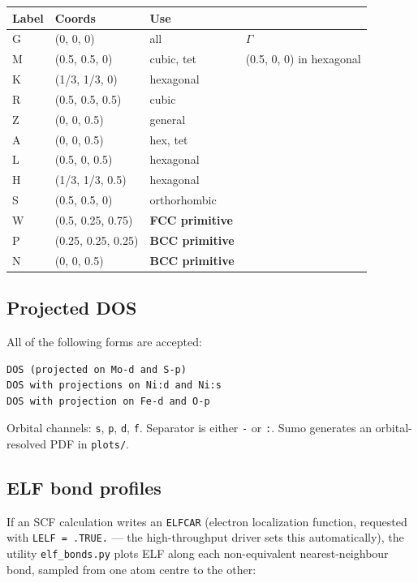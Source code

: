 \documentclass[11pt,a4paper]{scrartcl}
\newcommand{\thead}{\rowcolor{lightblue}}
\begin{document}
\begin{tabularx}{\linewidth}{@{}lllX@{}}
\thead
Label & Coords & Use & \\ \midrule
G & (0, 0, 0) & all & $\Gamma$ \\
M & (0.5, 0.5, 0) & cubic, tet & (0.5, 0, 0) in hexagonal \\
K & (1/3, 1/3, 0) & hexagonal & \\
R & (0.5, 0.5, 0.5) & cubic & \\
Z & (0, 0, 0.5) & general & \\
A & (0, 0, 0.5) & hex, tet & \\
L & (0.5, 0, 0.5) & hexagonal & \\
H & (1/3, 1/3, 0.5) & hexagonal & \\
S & (0.5, 0.5, 0) & orthorhombic & \\
W & (0.5, 0.25, 0.75) & \textbf{FCC primitive} & \\
P & (0.25, 0.25, 0.25) & \textbf{BCC primitive} & \\
N & (0, 0, 0.5) & \textbf{BCC primitive} & \\
\bottomrule
\end{tabularx}

\subsection{Projected DOS}

All of the following forms are accepted:

\begin{lstlisting}
DOS (projected on Mo-d and S-p)
DOS with projections on Ni:d and Ni:s
DOS with projection on Fe-d and O-p
\end{lstlisting}

Orbital channels: \texttt{s}, \texttt{p}, \texttt{d}, \texttt{f}.
Separator is either \texttt{-} or \texttt{:}.
Sumo generates an orbital-resolved PDF in \texttt{plots/}.

\subsection{ELF bond profiles}

If an SCF calculation writes an \texttt{ELFCAR} (electron localization
function, requested with \texttt{LELF = .TRUE.} --- the high-throughput
driver sets this automatically), the utility \texttt{elf\_bonds.py} plots ELF
along each non-equivalent nearest-neighbour bond, sampled from one atom centre
to the other:
\end{document}

